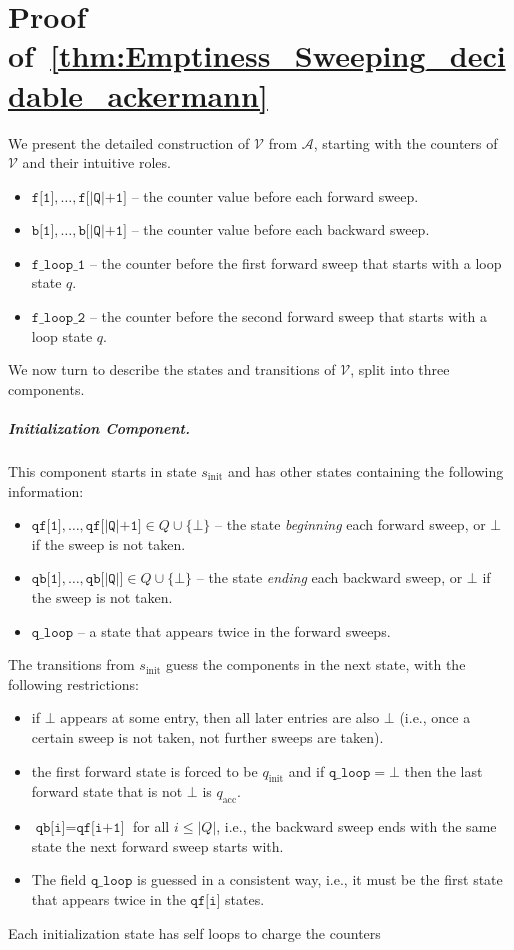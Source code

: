 \documentclass[USenglish]{lipics-v2021}
\newcommand{\initstate}{q_{\mathrm{init}}}
\newcommand{\accstate}{q_{\mathrm{acc}}}
\newcommand{\vf}[1]{\texttt{#1}}
\newcommand{\cA}{\mathcal{A}}
\newcommand{\cV}{\mathcal{V}}
\begin{document}
\section{Proof of~\cref{thm:Emptiness_Sweeping_decidable_ackermann}}
\label{sec:emptiness_sweeping_formal_upper_bound}
We present the detailed construction of $\cV$ from $\cA$, starting with the counters of $\cV$ and
their intuitive roles.
\begin{itemize}
\item $\vf{f[1]},\ldots, \vf{f[|Q|+1]}$ -- the counter value before each forward
sweep.
\item $\vf{b[1]},\ldots, \vf{b[|Q|+1]}$ -- the counter value before each backward
sweep.
\item $\vf{f\_loop\_1}$ -- the counter before the first forward sweep that
starts with a loop state $q$.
\item $\vf{f\_loop\_2}$ -- the counter before the second forward sweep that
starts with a loop state $q$.
\end{itemize} We now turn to describe the states and transitions of $\cV$, split
into three components.
\subparagraph*{Initialization Component.} This component starts in state
$s_{\textrm{init}}$ and has other states containing the following information:
\begin{itemize}
\item $\vf{qf[1]},\ldots,\vf{qf[|Q|+1]}\in Q\cup \{\bot\}$ -- the state \emph{beginning}
each forward sweep, or $\bot$ if the sweep is not taken.
\item $\vf{qb[1]},\ldots,\vf{qb[|Q|]}\in Q\cup \{\bot\}$ -- the state \emph{ending} each
backward sweep, or $\bot$ if the sweep is not taken.
\item $\vf{q\_loop}$ -- a state that appears twice in the forward sweeps.
\end{itemize} The transitions from $s_{\textrm{init}}$ guess the components in
the next state, with the following restrictions:
\begin{itemize}
\item if $\bot$ appears at some entry, then all later entries are also $\bot$
(i.e., once a certain sweep is not taken, not further sweeps are taken).
\item the first forward state is forced to be $\initstate$ and if
$\vf{q\_loop}=\bot$ then the last forward state that is not $\bot$ is $\accstate$.
\item $\vf{qb[i]}=\vf{qf[i+1]}$ for all $i\le |Q|$, i.e., the backward sweep
ends with the same state the next forward sweep starts with.
\item The field $\vf{q\_loop}$ is guessed in a consistent way, i.e., it must
be the first state that appears twice in the $\vf{qf[i]}$ states.
\end{itemize} Each initialization state has self loops to charge the counters
\end{document}
